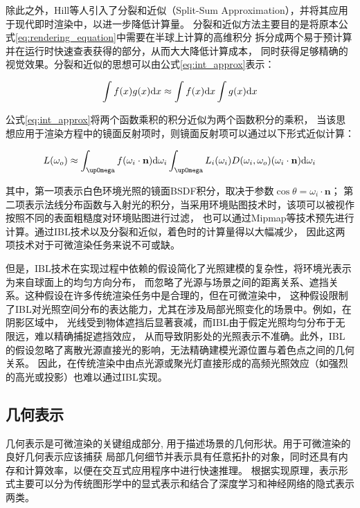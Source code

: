 除此之外，Hill等人\cite{Hill_2014}引入了分裂和近似（Split-Sum Approximation），并将其应用于现代即时渲染中，以进一步降低计算量。
分裂和近似方法主要目的是将原本公式\eqref{eq:rendering_equation}中需要在半球上计算的高维积分
拆分成两个易于预计算并在运行时快速查表获得的部分，从而大大降低计算成本，
同时获得足够精确的视觉效果。分裂和近似的思想可以由公式\eqref{eq:int_approx}表示：

\begin{equation}
  \int f(x)g(x){\rm{d}}x\approx \int{f(x){\rm{d}}x} \int{g(x){\rm{d}}x}
  \label{eq:int_approx}
\end{equation}

公式\eqref{eq:int_approx}将两个函数乘积的积分近似为两个函数积分的乘积，
当该思想应用于渲染方程中的镜面反射项时，则镜面反射项可以通过以下形式近似计算：

\begin{equation}
  L(\omega_o)\approx 
  \int_{\upOmega}{f(\omega_i\cdot{\bf{n}}){\rm{d}}\omega_i}
  \int_{\upOmega}{L_i(\omega_i)D(\omega_i,\omega_o)(\omega_i\cdot{\bf{n}}){\rm{d}}\omega_i}
  \label{eq:L_omega_o_approx}
\end{equation}

其中，第一项表示白色环境光照的镜面BSDF积分，取决于参数$\cos{\theta}=\omega_i\cdot{\mathbf{n}}；$
第二项表示法线分布函数与入射光的积分，当采用环境贴图技术时，该项可以被视作按照不同的表面粗糙度对环境贴图进行过滤，
也可以通过Mipmap等技术预先进行计算。通过IBL技术以及分裂和近似，着色时的计算量得以大幅减少，
因此这两项技术对于可微渲染任务来说不可或缺。

但是，IBL技术在实现过程中依赖的假设简化了光照建模的复杂性，将环境光表示为来自球面上的均匀方向分布，
而忽略了光源与场景之间的距离关系、遮挡关系。这种假设在许多传统渲染任务中是合理的，但在可微渲染中，
这种假设限制了IBL对光照空间分布的表达能力，尤其在涉及局部光照变化的场景中。例如，在阴影区域中，
光线受到物体遮挡后显著衰减，而IBL由于假定光照均匀分布于无限远，难以精确捕捉遮挡效应，
从而导致阴影处的光照表示不准确。此外，IBL的假设忽略了离散光源直接光的影响，无法精确建模光源位置与着色点之间的几何关系。
因此，在传统渲染中由点光源或聚光灯直接形成的高频光照效应（如强烈的高光或投影）也难以通过IBL实现。

\subsection{几何表示} \label{sec:geo_representation}
几何表示是可微渲染的关键组成部分, 用于描述场景的几何形状。用于可微渲染的良好几何表示应该捕获
局部几何细节并表示具有任意拓扑的对象，同时还具有内存和计算效率，以便在交互式应用程序中进行快速推理。
根据实现原理，表示形式主要可以分为传统图形学中的显式表示和结合了深度学习和神经网络的隐式表示两类。

